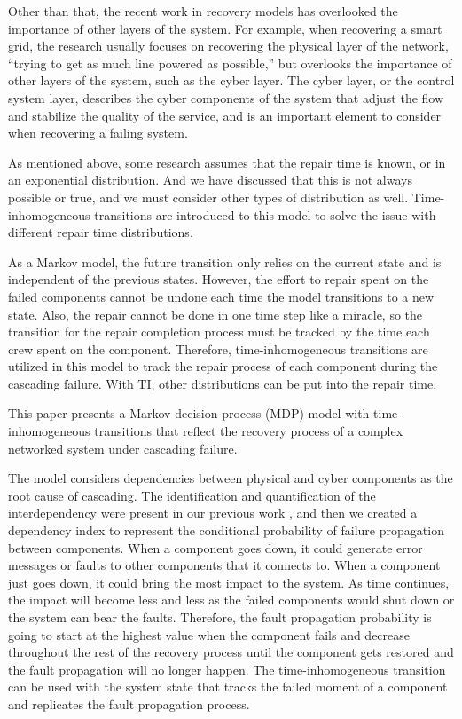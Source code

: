 Other than that, the recent work in recovery models has overlooked the importance of other layers of the system. For example, when recovering a smart grid, the research usually focuses on recovering the physical layer of the network, ``trying to get as much line powered as possible,'' but overlooks the importance of other layers of the system, such as the cyber layer. The cyber layer, or the control system layer, describes the cyber components of the system that adjust the flow and stabilize the quality of the service, and is an important element to consider when recovering a failing system.

As mentioned above, some research assumes that the repair time is known, or in an exponential distribution. And we have discussed that this is not always possible or true, and we must consider other types of distribution as well. Time-inhomogeneous transitions are introduced to this model to solve the issue with different repair time distributions. 

As a Markov model, the future transition only relies on the current state and is independent of the previous states. However, the effort to repair spent on the failed components cannot be undone each time the model transitions to a new state. Also, the repair cannot be done in one time step like a miracle, so the transition for the repair completion process must be tracked by the time each crew spent on the component. Therefore, time-inhomogeneous transitions are utilized in this model to track the repair process of each component during the cascading failure. With TI, other distributions can be put into the repair time.

This paper presents a Markov decision process (MDP) model with time-inhomogeneous transitions that reflect the recovery process of a complex networked system under cascading failure. 

The model considers dependencies between physical and cyber components as the root cause of cascading. The identification and quantification of the interdependency were present in our previous work \cite{marashi_identification_2021}, and then we created a dependency index to represent the conditional probability of failure propagation between components. When a component goes down, it could generate error messages or faults to other components that it connects to. When a component just goes down, it could bring the most impact to the system. As time continues, the impact will become less and less as the failed components would shut down or the system can bear the faults. Therefore, the fault propagation probability is going to start at the highest value when the component fails and decrease throughout the rest of the recovery process until the component gets restored and the fault propagation will no longer happen. The time-inhomogeneous transition can be used with the system state that tracks the failed moment of a component and replicates the fault propagation process. 
